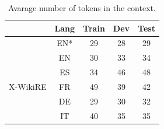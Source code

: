 \begin{table}[h!]
  \centering
    \begin{tabular}{c|c|ccc}
    \toprule
    \multicolumn{1}{r}{} & Lang  & Train & Dev   & Test \\
    \midrule
    \cite{levy2017zero} & EN*    & 29 & 28 & 29 \\
    \midrule
    \multirow{5}[2]{*}{X-WikiRE} & EN    & 30 & 33 & 34 \\
          & ES    & 34 & 46 & 48 \\
          & FR    & 49 & 39 & 42 \\
          & DE    & 29 & 30 & 32 \\
          & IT    & 40 & 35 & 35 \\
    \bottomrule
    \end{tabular}%
    \caption{Avarage number of tokens in the context.}
  \label{tab:addlabel}%
\end{table}%


